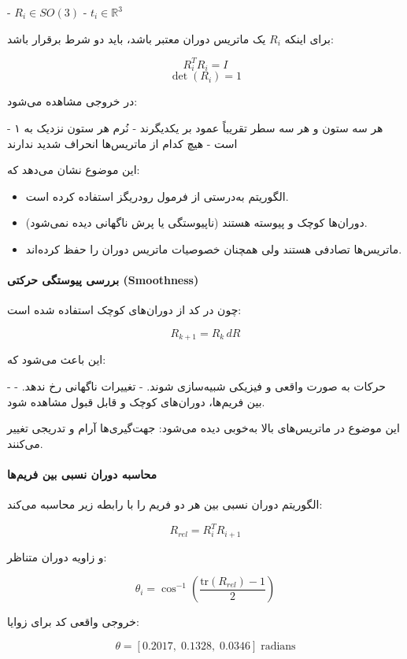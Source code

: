 \documentclass{article}
\begin{document}
- \( R_i \in SO(3) \)  
- \( t_i \in \mathbb{R}^3 \)

برای اینکه \(R_i\) یک ماتریس دوران معتبر باشد، باید دو شرط برقرار باشد:

\[
R_i^T R_i = I
\]
\[
\det(R_i) = 1
\]

در خروجی مشاهده می‌شود:

- هر سه ستون و هر سه سطر تقریباً عمود بر یکدیگرند  
- نُرم هر ستون نزدیک به ۱ است  
- هیچ کدام از ماتریس‌ها انحراف شدید ندارند  

این موضوع نشان می‌دهد که:

\begin{itemize}
	\item الگوریتم به‌درستی از فرمول رودریگز استفاده کرده است.
	\item دوران‌ها کوچک و پیوسته هستند (ناپیوستگی یا پرش ناگهانی دیده نمی‌شود).
	\item ماتریس‌ها تصادفی هستند ولی همچنان خصوصیات ماتریس دوران را حفظ کرده‌اند.
\end{itemize}

\paragraph{بررسی پیوستگی حرکتی (Smoothness)}

چون در کد از دوران‌های کوچک استفاده شده است:

\[
R_{k+1} = R_k \, dR
\]

این باعث می‌شود که:

- حرکات به صورت واقعی و فیزیکی شبیه‌سازی شوند.
- تغییرات ناگهانی رخ ندهد.
- بین فریم‌ها، دوران‌های کوچک و قابل قبول مشاهده شود.

این موضوع در ماتریس‌های بالا به‌خوبی دیده می‌شود: جهت‌گیری‌ها آرام و تدریجی تغییر می‌کنند.

\paragraph{محاسبه دوران نسبی بین فریم‌ها}

الگوریتم دوران نسبی بین هر دو فریم را با رابطه زیر محاسبه می‌کند:

\[
R_{rel} = R_i^T R_{i+1}
\]

و زاویه دوران متناظر:

\[
\theta_i = \cos^{-1}\left( \frac{\mathrm{tr}(R_{rel}) - 1}{2} \right)
\]

خروجی واقعی کد برای زوایا:

\[
\theta = [0.2017,\; 0.1328,\; 0.0346] \; \text{radians}
\]
\end{document}
